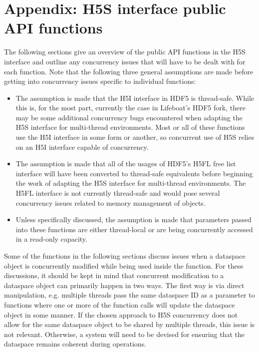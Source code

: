 \documentclass[../HDF5_RFC.tex]{subfiles}
\begin{document}
\newpage

\section{Appendix: H5S interface public API functions}
\label{apdx:h5s_functions}

The following sections give an overview of the public API functions in the H5S interface
and outline any concurrency issues that will have to be dealt with for each function.
Note that the following three general assumptions are made before getting into concurrency
issues specific to individual functions:

\begin{itemize}
    \item The assumption is made that the H5I interface in HDF5 is thread-safe. While this
          is, for the most part, currently the case in Lifeboat's HDF5 fork, there may be
          some additional concurrency bugs encountered when adapting the H5S interface
          for multi-thread environments. Most or all of these functions use the H5I interface
          in some form or another, so concurrent use of H5S relies on an H5I interface capable
          of concurrency.
    \item The assumption is made that all of the usages of HDF5's H5FL free list interface
          will have been converted to thread-safe equivalents before beginning the work of
          adapting the H5S interface for multi-thread environments. The H5FL interface is
          not currently thread-safe and would pose several concurrency issues related to
          memory management of objects.
    \item Unless specifically discussed, the assumption is made that parameters passed into
          these functions are either thread-local or are being concurrently accessed in
          a read-only capacity.
\end{itemize}

Some of the functions in the following sections discuss issues when a dataspace object is
concurrently modified while being used inside the function. For these discussions, it should
be kept in mind that concurrent modification to a dataspace object can primarily happen in two
ways. The first way is via direct manipulation, e.g. multiple threads pass the same dataspace
ID as a parameter to functions where one or more of the function calls will update the dataspace
object in some manner. If the chosen approach to H5S concurrency does not allow for the same
dataspace object to be shared by multiple threads, this issue is not relevant. Otherwise, a
system will need to be devised for ensuring that the dataspace remains coherent during operations.
\end{document}
